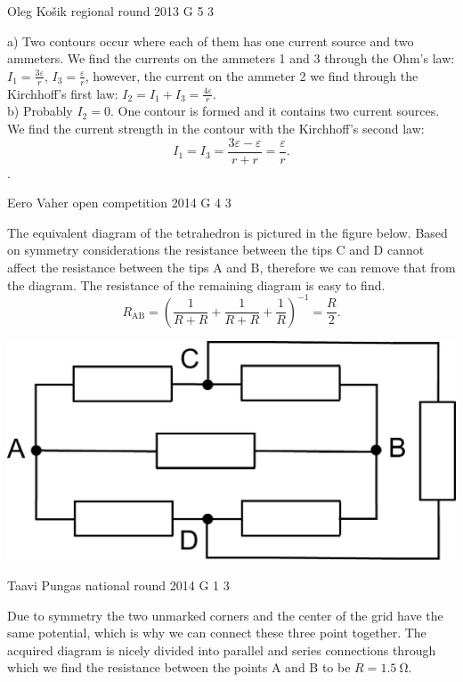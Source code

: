 \documentclass[11pt]{article}
\begin{document}
{Oleg Košik} %
{regional round} %
{2013} %
{G 5} %
{3} %
{

\ifEngSolution
a) Two contours occur where each of them has one current source and two ammeters. We find the currents on the ammeters 1 and 3 through the Ohm’s law: $I_1=\frac{3\varepsilon}{r}$, $I_3=\frac{\varepsilon}{r}$, however, the current on the ammeter 2 we find through the Kirchhoff’s first law: $I_2=I_1+I_3=\frac{4\varepsilon}{r}$.\\
b) Probably $I_2=0$. One contour is formed and it contains two current sources. We find the current strength in the contour with the Kirchhoff’s second law:
\[
I_1=I_3=\frac{3\varepsilon-\varepsilon}{r+r}=\frac{\varepsilon}{r}.
\].
\fi
}

{Eero Vaher} %
{open competition} %
{2014} %
{G 4} %
{3} %
{

\ifEngSolution
The equivalent diagram of the tetrahedron is pictured in the figure below. Based on symmetry considerations the resistance between the tips C and D cannot affect the resistance between the tips A and B, therefore we can remove that from the diagram. The resistance of the remaining diagram is easy to find.
\[R_\text{AB}=\left(\frac{1}{R+R}+\frac{1}{R+R}+\frac{1}{R}\right)^{-1}=\frac{R}{2}.\]
\begin{center}
\includegraphics[width=0.6\linewidth]{2014-lahg-04-skeem}
\end{center}
\fi
}

{Taavi Pungas} %
{national round} %
{2014} %
{G 1} %
{3} %
{

\ifEngSolution
Due to symmetry the two unmarked corners and the center of the grid have the same potential, which is why we can connect these three point together. The acquired diagram is nicely divided into parallel and series connections through which we find the resistance between the points A and B to be $R=\SI{1,5}{\ohm}$.
\fi
}
\end{document}
